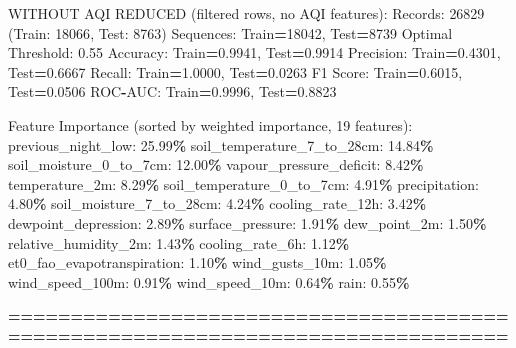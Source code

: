 \documentclass[
  letterpaper,
  DIV=11,
  numbers=noendperiod]{scrartcl}
\newenvironment{Shaded}{\begin{snugshade}}{\end{snugshade}}
\newcommand{\BuiltInTok}[1]{#1}
\newcommand{\DecValTok}[1]{\textcolor[rgb]{0.00,0.00,0.81}{#1}}
\newcommand{\FloatTok}[1]{\textcolor[rgb]{0.00,0.00,0.81}{#1}}
\newcommand{\NormalTok}[1]{#1}
\newcommand{\OperatorTok}[1]{\textcolor[rgb]{0.81,0.36,0.00}{\textbf{#1}}}
\begin{document}
\begin{Shaded}
\begin{Highlighting}[]
\NormalTok{WITHOUT AQI REDUCED (filtered rows, no AQI features):}
\NormalTok{  Records: }\DecValTok{26829}\NormalTok{ (Train: }\DecValTok{18066}\NormalTok{, Test: }\DecValTok{8763}\NormalTok{)}
\NormalTok{  Sequences: Train}\OperatorTok{=}\DecValTok{18042}\NormalTok{, Test}\OperatorTok{=}\DecValTok{8739}
\NormalTok{  Optimal Threshold: }\FloatTok{0.55}
\NormalTok{  Accuracy: Train}\OperatorTok{=}\FloatTok{0.9941}\NormalTok{, Test}\OperatorTok{=}\FloatTok{0.9914}
\NormalTok{  Precision: Train}\OperatorTok{=}\FloatTok{0.4301}\NormalTok{, Test}\OperatorTok{=}\FloatTok{0.6667}
\NormalTok{  Recall: Train}\OperatorTok{=}\FloatTok{1.0000}\NormalTok{, Test}\OperatorTok{=}\FloatTok{0.0263}
\NormalTok{  F1 Score: Train}\OperatorTok{=}\FloatTok{0.6015}\NormalTok{, Test}\OperatorTok{=}\FloatTok{0.0506}
\NormalTok{  ROC}\OperatorTok{{-}}\NormalTok{AUC: Train}\OperatorTok{=}\FloatTok{0.9996}\NormalTok{, Test}\OperatorTok{=}\FloatTok{0.8823}

\NormalTok{  Feature Importance (}\BuiltInTok{sorted}\NormalTok{ by weighted importance, }\DecValTok{19}\NormalTok{ features):}
\NormalTok{    previous\_night\_low: }\FloatTok{25.99}\OperatorTok{\%}
\NormalTok{    soil\_temperature\_7\_to\_28cm: }\FloatTok{14.84}\OperatorTok{\%}
\NormalTok{    soil\_moisture\_0\_to\_7cm: }\FloatTok{12.00}\OperatorTok{\%}
\NormalTok{    vapour\_pressure\_deficit: }\FloatTok{8.42}\OperatorTok{\%}
\NormalTok{    temperature\_2m: }\FloatTok{8.29}\OperatorTok{\%}
\NormalTok{    soil\_temperature\_0\_to\_7cm: }\FloatTok{4.91}\OperatorTok{\%}
\NormalTok{    precipitation: }\FloatTok{4.80}\OperatorTok{\%}
\NormalTok{    soil\_moisture\_7\_to\_28cm: }\FloatTok{4.24}\OperatorTok{\%}
\NormalTok{    cooling\_rate\_12h: }\FloatTok{3.42}\OperatorTok{\%}
\NormalTok{    dewpoint\_depression: }\FloatTok{2.89}\OperatorTok{\%}
\NormalTok{    surface\_pressure: }\FloatTok{1.91}\OperatorTok{\%}
\NormalTok{    dew\_point\_2m: }\FloatTok{1.50}\OperatorTok{\%}
\NormalTok{    relative\_humidity\_2m: }\FloatTok{1.43}\OperatorTok{\%}
\NormalTok{    cooling\_rate\_6h: }\FloatTok{1.12}\OperatorTok{\%}
\NormalTok{    et0\_fao\_evapotranspiration: }\FloatTok{1.10}\OperatorTok{\%}
\NormalTok{    wind\_gusts\_10m: }\FloatTok{1.05}\OperatorTok{\%}
\NormalTok{    wind\_speed\_100m: }\FloatTok{0.91}\OperatorTok{\%}
\NormalTok{    wind\_speed\_10m: }\FloatTok{0.64}\OperatorTok{\%}
\NormalTok{    rain: }\FloatTok{0.55}\OperatorTok{\%}

\OperatorTok{================================================================================}


\end{Highlighting}
\end{Shaded}
\end{document}
